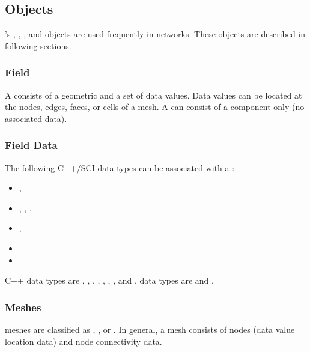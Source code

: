 \subsection{\sr{} Objects}
\label{sec:sr-objects}


\sr{}'s , , , and
 objects are used frequently in networks.  These
objects are described in following sections.

\subsubsection{Field}

A \sr{}  consists of a geometric  and a
set of data values.  Data values can be located at the nodes, edges,
faces, or cells of a mesh.  A  can consist of a
 component only (no associated data).

\subsubsection{Field Data}

The following C++/SCI data types can be associated with a :

\begin{itemize}
\item {}, 
\item {}, , , 
\item {}, 
\item {}
\item {}
\end{itemize}

C++ data types are , ,
, , ,
, , and .  \sr{} data types are  and .

\subsubsection{Meshes}

\sr{} meshes are classified as , , or
.  In general, a mesh consists of nodes (data value location
data) and node connectivity data.

